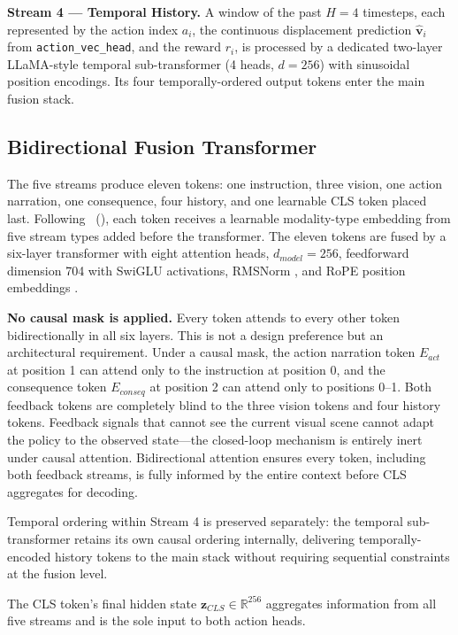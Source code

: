 \documentclass[letterpaper]{article} %
\begin{document}
\textbf{Stream 4 --- Temporal History.} A window of the past $H{=}4$ timesteps, each represented by the action index $a_i$, the continuous displacement prediction $\hat{\mathbf{v}}_i$ from \texttt{action\_vec\_head}, and the reward $r_i$, is processed by a dedicated two-layer LLaMA-style temporal sub-transformer (4 heads, $d{=}256$) with sinusoidal position encodings. Its four temporally-ordered output tokens enter the main fusion stack.

\subsection{Bidirectional Fusion Transformer}

The five streams produce eleven tokens: one instruction, three vision, one action narration, one consequence, four history, and one learnable CLS token placed last. Following \citeauthor{kim2021vilt}~(\citeyear{kim2021vilt}), each token receives a learnable modality-type embedding from five stream types added before the transformer. The eleven tokens are fused by a six-layer transformer with eight attention heads, $d_{model}{=}256$, feedforward dimension 704 with SwiGLU \cite{shazeer2020swiglu} activations, RMSNorm \cite{zhang2019rmsnorm}, and RoPE position embeddings \cite{su2021rope}.

\textbf{No causal mask is applied.} Every token attends to every other token bidirectionally in all six layers. This is not a design preference but an architectural requirement. Under a causal mask, the action narration token $E_{act}$ at position 1 can attend only to the instruction at position 0, and the consequence token $E_{conseq}$ at position 2 can attend only to positions 0--1. Both feedback tokens are completely blind to the three vision tokens and four history tokens. Feedback signals that cannot see the current visual scene cannot adapt the policy to the observed state---the closed-loop mechanism is entirely inert under causal attention. Bidirectional attention ensures every token, including both feedback streams, is fully informed by the entire context before CLS aggregates for decoding.

Temporal ordering within Stream 4 is preserved separately: the temporal sub-transformer retains its own causal ordering internally, delivering temporally-encoded history tokens to the main stack without requiring sequential constraints at the fusion level.

The CLS token's final hidden state $\mathbf{z}_{CLS} \in \mathbb{R}^{256}$ aggregates information from all five streams and is the sole input to both action heads.
\end{document}
